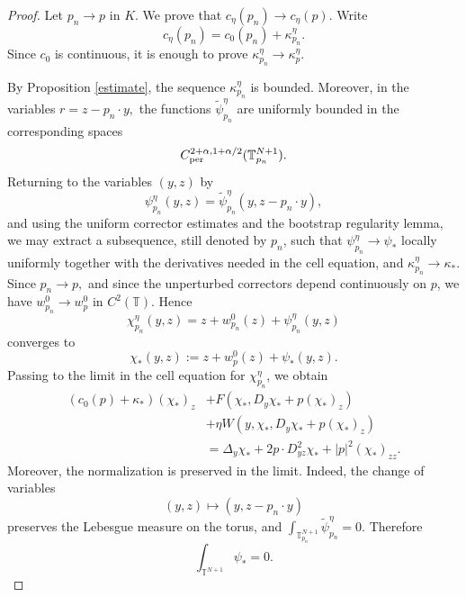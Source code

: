 \documentclass[preprint]{elsarticle}
\numberwithin{equation}{section}
\begin{document}
\begin{proof}
Let
$
p_n\to p
\text{ in }K.
$
We prove that
$
c_\eta(p_n)\to c_\eta(p).
$
Write
$$
c_\eta(p_n)=c_0(p_n)+\kappa_{p_n}^\eta.
$$
Since $c_0$ is continuous, it is enough to prove
$
\kappa_{p_n}^\eta\to \kappa_p^\eta.
$

By Proposition \ref{estimate}, the sequence
$
\kappa_{p_n}^\eta
$
is bounded. Moreover, in the variables
$
r=z-p_n\cdot y,
$
the functions
$
\widetilde\psi_{p_n}^\eta
$
are uniformly bounded in the corresponding spaces
$$
C_{\rm per}^{2+\alpha,1+\alpha/2}(\mathbb T_{p_n}^{N+1}).
$$
Returning to the variables $(y,z)$ by
\begin{equation}
\psi_{p_n}^\eta(y,z)
=
\widetilde\psi_{p_n}^\eta(y,z-p_n\cdot y),
\end{equation}
and using the uniform corrector estimates and the bootstrap regularity lemma, we may extract a subsequence, still denoted by $p_n$, such that $\psi_{p_n}^\eta\to \psi_*$
locally uniformly together with the derivatives needed in the cell equation, and $\kappa_{p_n}^\eta\to\kappa_*.$
Since
$
p_n\to p,
$
and since the unperturbed correctors depend continuously on $p$, we have $w_{p_n}^0\to w_p^0$
in $C^2(\mathbb T)$. Hence
\begin{equation}
\chi_{p_n}^\eta(y,z)
=
z+w_{p_n}^0(z)+\psi_{p_n}^\eta(y,z)
\end{equation}
converges to
\begin{equation}
\chi_*(y,z):=z+w_p^0(z)+\psi_*(y,z).
\end{equation}
Passing to the limit in the cell equation for $\chi_{p_n}^\eta$, we obtain
\begin{equation*}
\begin{aligned}
(c_0(p)+\kappa_*)(\chi_*)_z
&+
F\left(\chi_*,D_y\chi_*+p(\chi_*)_z\right)
\\
&+
\eta W\left(y,\chi_*,D_y\chi_*+p(\chi_*)_z\right)
\\
&=
\Delta_y\chi_*
+
2p\cdot D^2_{yz}\chi_*
+
|p|^2(\chi_*)_{zz}.
\end{aligned}
\end{equation*}
Moreover, the normalization is preserved in the limit. Indeed, the change of variables
$$
(y,z)\longmapsto (y,z-p_n\cdot y)
$$
preserves the Lebesgue measure on the torus, and
$
\int_{\mathbb T_{p_n}^{N+1}}\widetilde\psi_{p_n}^\eta=0.
$
Therefore
\begin{equation*}
\int_{\mathbb T^{N+1}}\psi_*=0.
\end{equation*}


\end{proof}
\end{document}
